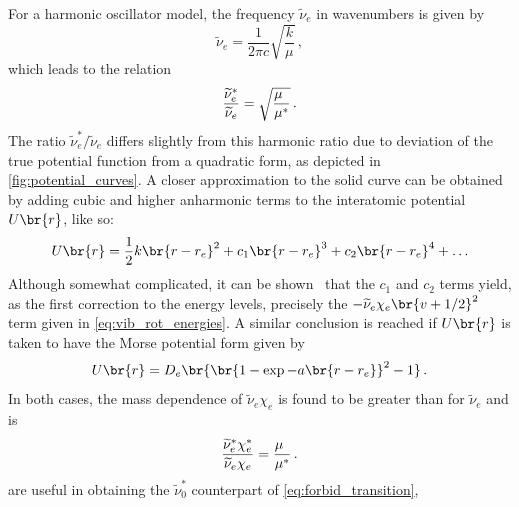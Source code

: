 For a harmonic oscillator model, the frequency \( \widetilde{\nu}_e \) in wavenumbers is given by 
\begin{equation}
	\widetilde{\nu}_e = \frac{1}{2 \pi c} \sqrt{\frac{k}{\mu}} \, ,
	\label{eq:ho_freq}
\end{equation}
which leads to the relation 
\begin{equation}
	\frac{\widetilde{\nu}_e^*}{\widetilde{\nu}_e} = \sqrt{\frac{\mu\hphantom{^*}}{\mu^*}}\, .
	\label{eq:ho_freq_relation}
\end{equation}
The ratio \( \widetilde{\nu}_e^* / \widetilde{\nu}_e \) differs slightly from this harmonic ratio due to deviation of the true potential function from a quadratic form, as depicted in \cref{fig:potential_curves}. 
A closer approximation to the solid curve can be obtained by adding cubic and higher anharmonic terms to the interatomic potential \( U\br{r} \), like so:
\begin{equation}
	U\br{r} = \frac{1}{2} k \br{r - r_e}^2 + c_1 \br{r - r_e}^3 + c_2 \br{r - r_e}^4 + \ldots
	\label{eq:anharmonic_expansion}
\end{equation}
Although somewhat complicated, it can be shown~\autocite{herzberg89,levine75} that the \( c_1 \) and \( c_2 \) terms yield, as the first correction to the energy levels, precisely the \( -\widetilde{\nu}_e \chi_e \br{v + {1}/{2}}^2 \) term given in \cref{eq:vib_rot_energies}. 
A similar conclusion is reached if \( U\br{r} \) is taken to have the Morse potential form given by 
\begin{equation}
	U\br{r} = D_e \br{\br{1 - \exp{-a\br{r - r_e}}}^2 - 1} \, .
	\label{eq_morse_potential}
\end{equation}
In both cases, the mass dependence of \( \widetilde{\nu}_e \chi_e \) is found to be greater than for \( \widetilde{\nu}_e \) and is
\begin{equation}
	\frac{\widetilde{\nu}_e^* \chi_e^*}{\widetilde{\nu}_e \chi_e } = \frac{\mu\hphantom{^*}}{\mu^*} \, .
	\label{eq:ve_isotope_relation}
\end{equation}
 are useful in obtaining the \( \widetilde{\nu}_0^* \) counterpart of \cref{eq:forbid_transition},
